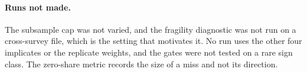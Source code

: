 \paragraph{Runs not made.} The subsample cap was not varied, and the fragility
diagnostic was not run on a cross-survey file, which is the setting that
motivates it. No run uses the other four \scf{} implicates or the replicate
weights, and the gates were not tested on a rare sign class. The zero-share
metric records the size of a miss and not its direction.

